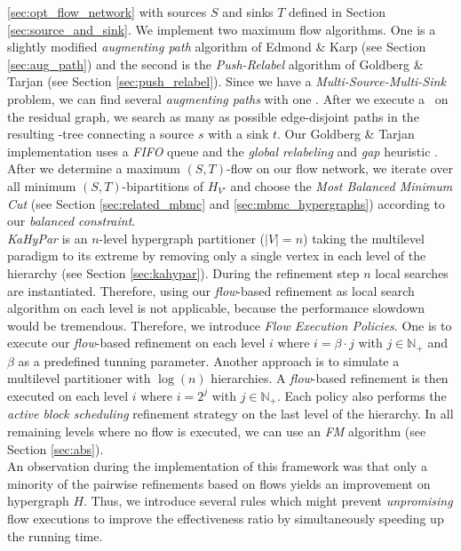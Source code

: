 \ref{sec:opt_flow_network} with sources $S$ and sinks $T$ defined in
Section \ref{sec:source_and_sink}. We implement two maximum flow algorithms.
One is a slightly modified \emph{augmenting path} algorithm of Edmond \& Karp
\cite{edmonds1972theoretical} (see Section \ref{sec:aug_path}) 
and the second is the \emph{Push-Relabel} algorithm of
Goldberg \& Tarjan \cite{cherkassky1997implementing,goldberg1988new} 
(see Section \ref{sec:push_relabel}). Since we have a 
\emph{Multi-Source-Multi-Sink} problem, we can find several \emph{augmenting paths}
with one \BFS. After we execute a \BFS~on the residual graph, we search 
as many as possible edge-disjoint paths in the resulting \BFS-tree connecting a source $s$
with a sink $t$. Our Goldberg \& Tarjan implementation uses a \emph{FIFO} queue and
the \emph{global relabeling} and \emph{gap} heuristic \cite{cherkassky1997implementing}.
After we determine a maximum $(S,T)$-flow on our flow network, we iterate over
all minimum $(S,T)$-bipartitions of $H_{V'}$ \cite{picard1980structure} and choose 
the \emph{Most Balanced Minimum Cut} (see Section \ref{sec:related_mbmc} and 
\ref{sec:mbmc_hypergraphs}) according to our \emph{balanced constraint}. \\
\emph{KaHyPar} is an $n$-level hypergraph partitioner ($|V| = n$) taking the 
multilevel paradigm to its extreme by removing only a single vertex in each level
of the hierarchy \cite{akhremtsev2017engineering} (see Section \ref{sec:kahypar}). 
During the refinement step $n$ local searches are instantiated. Therefore, 
using our \emph{flow}-based refinement as local search algorithm on each level is not 
applicable, because the performance slowdown would be tremendous. Therefore,
we introduce \emph{Flow Execution Policies}. One is to execute our \emph{flow}-based
refinement on each level $i$ where $i = \beta\cdot j$ with $j \in \mathbb{N}_+$ and
$\beta$ as a predefined tunning parameter. Another approach is to simulate a
multilevel partitioner with $\log(n)$ hierarchies. A \emph{flow}-based refinement is then
executed on each level $i$ where $i = 2^j$ with $j \in \mathbb{N}_+$. Each policy also
performs the \emph{active block scheduling} refinement strategy on the last level of the
hierarchy. In all remaining levels where no flow is executed, we can use an 
\emph{FM} algorithm 
\cite{akhremtsev2017engineering,fiduccia1988linear,sanchis1989multiple} (see Section 
\ref{sec:abs}). \\
An observation during the implementation of this framework was that only a minority
of the pairwise refinements based on flows yields an improvement
on hypergraph $H$. Thus, we introduce several rules which might prevent
\emph{unpromising} flow executions to improve the effectiveness ratio by simultaneously speeding up
the running time.

